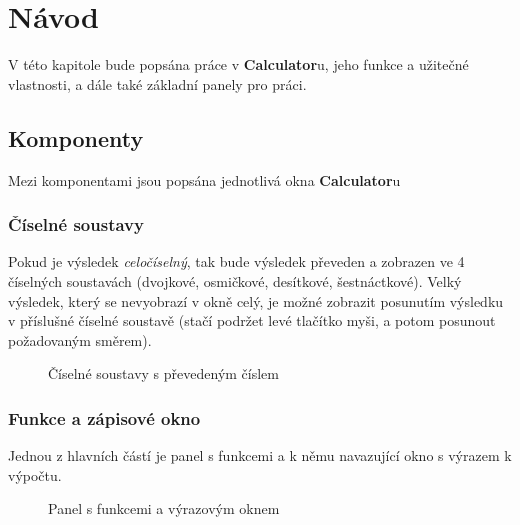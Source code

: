 \documentclass[a4paper, 11pt]{article}
\begin{document}
\section{Návod}

V této kapitole bude popsána práce v \textbf{Calculator}u, jeho funkce a užitečné
vlastnosti, a dále také základní panely pro práci.

\subsection{Komponenty}

Mezi komponentami jsou popsána jednotlivá okna \textbf{Calculator}u

\subsubsection{Číselné soustavy}

Pokud je výsledek \emph{celočíselný}, tak bude výsledek převeden a
zobrazen ve 4 číselných soustavách (dvojkové, osmičkové, desítkové,
šestnáctkové). Velký výsledek, který se nevyobrazí v okně celý, je možné
zobrazit posunutím výsledku v příslušné číselné soustavě (stačí podržet levé tlačítko myši, a potom posunout požadovaným směrem).

\begin{figure}[H]
    \centering
    \caption{Číselné soustavy s převedeným číslem}
\end{figure}


\subsubsection{Funkce a zápisové okno}

Jednou z hlavních částí je panel s funkcemi a k němu navazující okno s
výrazem k výpočtu.

\begin{figure}[H]
    \centering
    \caption{Panel s funkcemi a výrazovým oknem}
\end{figure}
\end{document}

